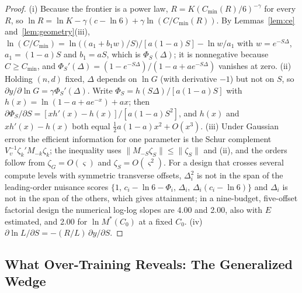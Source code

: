 \begin{proof}
(i) Because the frontier is a power law, $R=K(C_{\min}(R)/6)^{-\gamma}$ for every $R$, so
$\ln R=\ln K-\gamma(c-\ln6)+\gamma\ln(C/C_{\min}(R))$. By Lemmas~\ref{lem:ce} and~\ref{lem:geometry}(iii),
$\ln(C/C_{\min})=\ln\big((a_1+b_1w)/S\big)/[a(1-a)S]-\ln w/a_1$ with $w=e^{-S\Delta}$, $a_1=(1-a)S$ and $b_1=aS$, which is
$\Phi_S(\Delta)$; it is nonnegative because $C\ge C_{\min}$, and $\Phi_S'(\Delta)=(1-e^{-S\Delta})/(1-a+ae^{-S\Delta})$
vanishes at zero. (ii) Holding $(n,d)$ fixed, $\Delta$ depends on $\ln G$ (with derivative $-1$) but not on $S$, so
$\partial y/\partial\ln G=\gamma\Phi_S'(\Delta)$. Write $\Phi_S=h(S\Delta)/[a(1-a)S]$ with $h(x)=\ln(1-a+ae^{-x})+ax$; then
$\partial\Phi_S/\partial S=[xh'(x)-h(x)]/[a(1-a)S^2]$, and $h(x)$ and $xh'(x)-h(x)$ both equal $\tfrac12a(1-a)x^2+O(x^3)$.
(iii) Under Gaussian errors the efficient information for one parameter is the Schur complement
$V_\upsilon^{-1}\zeta_k'M_{-k}\zeta_k$; the inequality uses $\|M_{-S}\zeta_S\|\le\|\zeta_S\|$ and (ii), and the orders follow
from $\zeta_G=O(\varsigma)$ and $\zeta_S=O(\varsigma^2)$. For a design that crosses several compute levels with symmetric
transverse offsets, $\Delta_i^2$ is not in the span of the leading-order nuisance scores
$\{1,\,c_i-\ln6-\Phi_i,\,\Delta_i,\,\Delta_i(c_i-\ln6)\}$ and $\Delta_i$ is not in the span of the others, which gives
attainment; in a nine-budget, five-offset factorial design the numerical log-log slopes are 4.00 and 2.00, also with $E$
estimated, and 2.00 for $\ln M^*(C_0)$ at a fixed $C_0$. (iv) $\partial\ln L/\partial S=-(R/L)\,\partial y/\partial S$.
\end{proof}

\subsection{What Over-Training Reveals: The Generalized Wedge}\label{app:A-wedge-sub}

